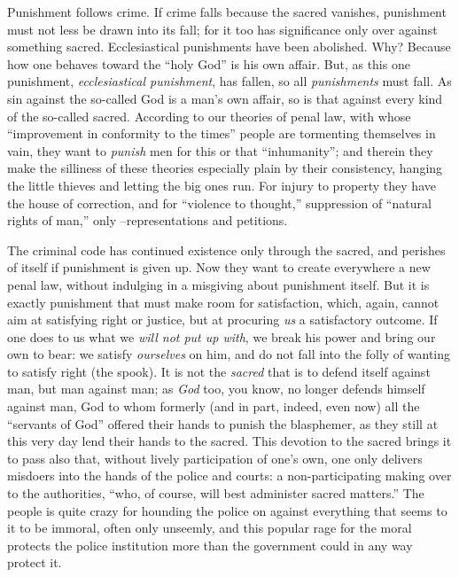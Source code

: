 \documentclass[12pt,a4paper]{book}
\begin{document}
Punishment follows crime. If crime falls because the sacred vanishes, 
punishment must not less be drawn into its fall; for it too has significance 
only over against something sacred. Ecclesiastical punishments have been 
abolished. Why? Because how one behaves toward the ``holy God'' is his own 
affair. But, as this one punishment, \textit{ecclesiastical punishment}, has 
fallen, so all \textit{punishments} must fall. As sin against the so-called 
God is a man's own affair, so is that against every kind of the so-called 
sacred. According to our theories of penal law, with whose ``improvement in 
conformity to the times'' people are tormenting themselves in vain, they want 
to \textit{punish} men for this or that ``inhumanity''; and therein they 
make the silliness of these theories especially plain by their consistency, 
hanging the little thieves and letting the big ones run. For injury to 
property they have the house of correction, and for ``violence to thought,'' 
suppression of ``natural rights of man,'' only --representations and 
petitions.

The criminal code has continued existence only through the sacred, and 
perishes of itself if punishment is given up. Now they want to create 
everywhere a new penal law, without indulging in a misgiving about punishment 
itself. But it is exactly punishment that must make room for satisfaction, 
which, again, cannot aim at satisfying right or justice, but at procuring 
\textit{us} a satisfactory outcome. If one does to us what we \textit{will not 
put up with}, we break his power and bring our own to bear: we satisfy 
\textit{ourselves} on him, and do not fall into the folly of wanting to 
satisfy right (the spook). It is not the \textit{sacred} that is to defend 
itself against man, but man against man; as \textit{God} too, you know, no 
longer defends himself against man, God to whom formerly (and in part, indeed, 
even now) all the ``servants of God'' offered their hands to punish the 
blasphemer, as they still at this very day lend their hands to the sacred. 
This devotion to the sacred brings it to pass also that, without lively 
participation of one's own, one only delivers misdoers into the hands of the 
police and courts: a non-participating making over to the authorities, ``who, 
of course, will best administer sacred matters.'' The people is quite crazy 
for hounding the police on against everything that seems to it to be immoral, 
often only unseemly, and this popular rage for the moral protects the police 
institution more than the government could in any way protect it.
\end{document}
